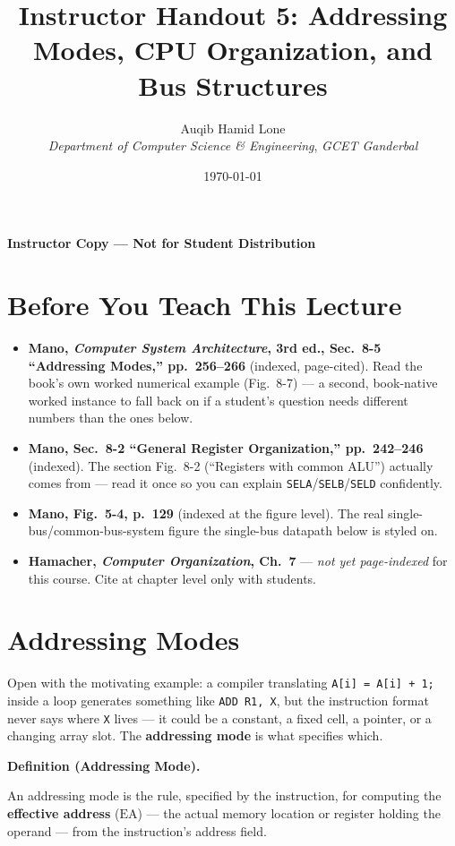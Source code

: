 \documentclass[11pt]{article}
\title{Instructor Handout 5: Addressing Modes, CPU Organization, and Bus Structures}
\author{Auqib Hamid Lone\\[0.3em]
  \emph{Department of Computer Science \& Engineering}, \emph{GCET Ganderbal}}
\date{\today}
\newenvironment{definitionbox}[1]{%
  \par\noindent\textbf{Definition (#1).}\ \itshape
}{\par\vspace{0.3em}}
\begin{document}
\maketitle
{\centering\large\color{negative}\textbf{Instructor Copy --- Not for Student Distribution}\par}
\vspace{0.5cm}

\section{Before You Teach This Lecture}

\begin{itemize}
  \item \textbf{Mano, \textit{Computer System Architecture}, 3rd ed., Sec.~8-5 ``Addressing Modes,'' pp.~256--266} (indexed, page-cited). Read the book's own worked numerical example (Fig.~8-7) --- a second, book-native worked instance to fall back on if a student's question needs different numbers than the ones below.
  \item \textbf{Mano, Sec.~8-2 ``General Register Organization,'' pp.~242--246} (indexed). The section Fig.~8-2 (``Registers with common ALU'') actually comes from --- read it once so you can explain \texttt{SELA}/\texttt{SELB}/\texttt{SELD} confidently.
  \item \textbf{Mano, Fig.~5-4, p.~129} (indexed at the figure level). The real single-bus/common-bus-system figure the single-bus datapath below is styled on.
  \item \textbf{Hamacher, \textit{Computer Organization}, Ch.~7} --- \emph{not yet page-indexed} for this course. Cite at chapter level only with students.
\end{itemize}

\section{Addressing Modes}

Open with the motivating example: a compiler translating \texttt{A[i] = A[i] + 1;} inside a loop generates something like \texttt{ADD R1, X}, but the instruction format never says where \texttt{X} lives --- it could be a constant, a fixed cell, a pointer, or a changing array slot. The \textbf{addressing mode} is what specifies which.

\begin{definitionbox}{Addressing Mode}
An addressing mode is the rule, specified by the instruction, for computing the \textup{\textbf{effective address}} ($\text{EA}$) --- the actual memory location or register holding the operand --- from the instruction's address field.
\end{definitionbox}
\end{document}
